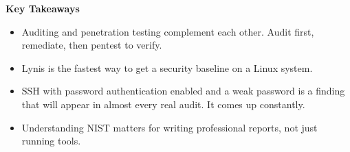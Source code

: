 \begin{notebox}
\begin{takebox}
\textbf{Key Takeaways}
\begin{itemize}
  \item Auditing and penetration testing complement each other. Audit first,
        remediate, then pentest to verify.
  \item Lynis is the fastest way to get a security baseline on a Linux system.
  \item SSH with password authentication enabled and a weak password is a finding
        that will appear in almost every real audit. It comes up constantly.
  \item Understanding NIST matters for writing professional reports, not just
        running tools.
\end{itemize}
\end{takebox}

\end{notebox}